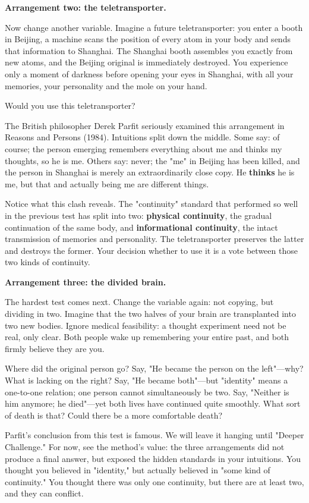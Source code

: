 \textbf{Arrangement two: the teletransporter.}

Now change another variable. Imagine a future teletransporter: you enter a booth in Beijing, a machine scans the position of every atom in your body and sends that information to Shanghai. The Shanghai booth assembles you exactly from new atoms, and the Beijing original is immediately destroyed. You experience only a moment of darkness before opening your eyes in Shanghai, with all your memories, your personality and the mole on your hand.

Would you use this teletransporter?

The British philosopher Derek Parfit seriously examined this arrangement in Reasons and Persons (1984). Intuitions split down the middle. Some say: of course; the person emerging remembers everything about me and thinks my thoughts, so he is me. Others say: never; the "me" in Beijing has been killed, and the person in Shanghai is merely an extraordinarily close copy. He \textbf{thinks} he is me, but that and actually being me are different things.

Notice what this clash reveals. The "continuity" standard that performed so well in the previous test has split into two: \textbf{physical continuity}, the gradual continuation of the same body, and \textbf{informational continuity}, the intact transmission of memories and personality. The teletransporter preserves the latter and destroys the former. Your decision whether to use it is a vote between those two kinds of continuity.

\textbf{Arrangement three: the divided brain.}

The hardest test comes next. Change the variable again: not copying, but dividing in two. Imagine that the two halves of your brain are transplanted into two new bodies. Ignore medical feasibility: a thought experiment need not be real, only clear. Both people wake up remembering your entire past, and both firmly believe they are you.

Where did the original person go? Say, "He became the person on the left"---why? What is lacking on the right? Say, "He became both"---but "identity" means a one-to-one relation; one person cannot simultaneously be two. Say, "Neither is him anymore; he died"---yet both lives have continued quite smoothly. What sort of death is that? Could there be a more comfortable death?

Parfit's conclusion from this test is famous. We will leave it hanging until "Deeper Challenge." For now, see the method's value: the three arrangements did not produce a final answer, but exposed the hidden standards in your intuitions. You thought you believed in "identity," but actually believed in "some kind of continuity." You thought there was only one continuity, but there are at least two, and they can conflict.

